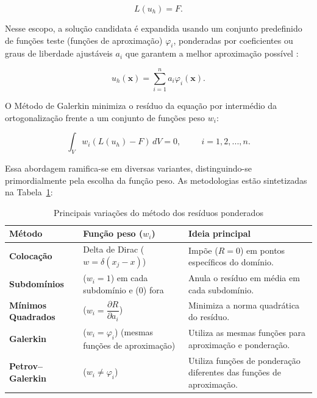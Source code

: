 \begin{equation}
    L(u_h) = F.
    \label{eq:3.49}
\end{equation}

\indent Nesse escopo, a solução candidata é expandida usando um conjunto predefinido de funções teste (funções de aproximação) $\varphi_i$, ponderadas por coeficientes ou graus de liberdade ajustáveis $a_i$ que garantem a melhor aproximação possível \citet{hughes1987finite}: 

\begin{equation}
    u_h(\mathbf{x}) = \sum_{i=1}^n a_i \varphi_i(\mathbf{x}).
    \label{eq:3.50}
\end{equation}


\indent O Método de Galerkin minimiza o resíduo da equação por intermédio da ortogonalização frente a um conjunto de funções peso $w_i$: 

\begin{equation}
    \int_{V} w_i (L(u_h) - F) \, dV = 0, \hspace{1cm} i = 1,2,...,n.
    \label{eq:3.51}
\end{equation}



\indent Essa abordagem ramifica-se em diversas variantes, distinguindo-se primordialmente pela escolha da função peso. As metodologias estão sintetizadas na Tabela~\ref{tab:3.2}:

    
\begin{table}[htbp]
    \centering
    \caption{Principais variações do método dos resíduos ponderados}
    \begin{tabular}{p{5cm}p{5cm}p{5cm}}
        \textbf{Método} & \textbf{Função peso ($w_i$)} & \textbf{Ideia principal} \\
        \hline
        \textbf{Colocação} & Delta de Dirac ($w = \delta(x_j - x)$) & Impõe ($R=0$) em pontos específicos do domínio. \\[3pt]
        \textbf{Subdomínios} & ($w_i=1$) em cada subdomínio e ($0$) fora & Anula o resíduo em média em cada subdomínio. \\[3pt]
        \textbf{Mínimos Quadrados} & ($w_i=\dfrac{\partial R}{\partial a_i}$) & Minimiza a norma quadrática do resíduo. \\[3pt]
        \textbf{Galerkin} & ($w_i=\varphi_i$) (mesmas funções de aproximação) & Utiliza as mesmas funções para aproximação e ponderação. \\[3pt]
        \textbf{Petrov–Galerkin} & ($w_i\neq \varphi_i$) & Utiliza funções de ponderação diferentes das funções de aproximação.
    \end{tabular}
    \label{tab:3.2}
\end{table}


